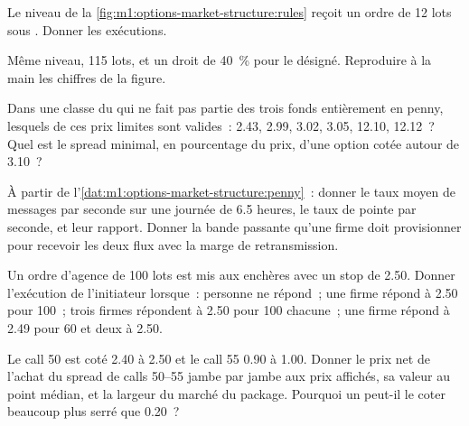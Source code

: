 \begin{exercise}[$\star$]\label{exo:m1:options-market-structure:1}
Le niveau de la \cref{fig:m1:options-market-structure:rules} reçoit un ordre
de 12 lots sous . Donner les exécutions.
\end{exercise}

\begin{exercise}[$\star$]\label{exo:m1:options-market-structure:2}
Même niveau, 115 lots,  et un droit de 40~\% pour le
 désigné. Reproduire à la main les chiffres de la figure.
\end{exercise}

\begin{exercise}[$\star$]\label{exo:m1:options-market-structure:3}
Dans une classe du  qui ne fait pas partie des trois fonds
entièrement en penny, lesquels de ces prix limites sont valides~: 2.43, 2.99, 3.02,
3.05, 12.10, 12.12~? Quel est le spread minimal, en pourcentage du prix, d'une option cotée
autour de 3.10~?
\end{exercise}

\begin{exercise}[$\star\star$]\label{exo:m1:options-market-structure:4}
À partir de l'\cref{dat:m1:options-market-structure:penny}~: donner le taux moyen de messages
par seconde sur une journée de 6.5 heures, le taux de pointe par seconde, et leur
rapport. Donner la bande passante qu'une firme doit provisionner pour recevoir les deux flux avec la
marge de retransmission.
\end{exercise}

\begin{exercise}[$\star\star$]\label{exo:m1:options-market-structure:5}
Un ordre d'agence de 100 lots est mis aux enchères avec un stop de 2.50. Donner
l'exécution de l'initiateur lorsque~: personne ne répond~; une firme répond à 2.50 pour 100~;
trois firmes répondent à 2.50 pour 100 chacune~; une firme répond à 2.49 pour 60 et
deux à 2.50.
\end{exercise}

\begin{exercise}[$\star\star$]\label{exo:m1:options-market-structure:6}
Le call 50 est coté 2.40 à 2.50 et le call 55 0.90 à 1.00. Donner le prix net
de l'achat du spread de calls 50--55 jambe par jambe aux prix affichés, sa
valeur au point médian, et la largeur du marché du package. Pourquoi un 
peut-il le coter beaucoup plus serré que 0.20~?
\end{exercise}

